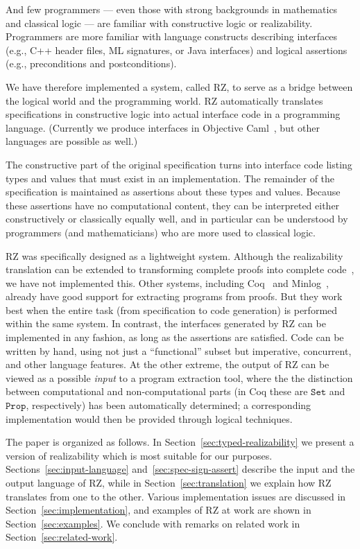 And few programmers --- even those with strong backgrounds in
mathematics and classical logic --- are familiar with constructive logic or
realizability.  Programmers are more familiar with language constructs
describing interfaces (e.g., C++ header files, ML signatures, or Java
interfaces) and logical assertions (e.g., preconditions
and postconditions).


We have therefore implemented a system, called RZ, to serve as a bridge between
the logical world and the programming world. RZ automatically translates
specifications in constructive logic into actual interface code in a
programming language. (Currently we produce interfaces in 
Objective Caml~\cite{ocaml}, but other languages are possible
as well.)

The constructive part of the original specification turns into interface code
listing types and values that must exist in an implementation. The remainder of
the specification is maintained as assertions about these types and values.
Because these assertions have no computational content, they can be interpreted
either constructively or classically equally well, and in particular can
be understood by programmers (and mathematicians) who are more used to
classical logic.


RZ was specifically designed as a lightweight system. Although the
realizability translation can be extended to transforming complete
proofs into complete code~\cite{komagata+:tr95}, we have not
implemented this. Other systems, including Coq~\cite{coqart} and
Minlog~\cite{benl98:_proof_theor_work}, already have good support for
extracting programs from proofs. But they work best when the entire
task (from specification to code generation) is performed within the
same system. In contrast, the interfaces generated by RZ can be
implemented in any fashion, as long as the assertions are satisfied.
Code can be written by hand, using not just a ``functional'' subset
but imperative, concurrent, and other language features. At the other
extreme, the output of RZ can be viewed as a possible \emph{input} to
a program extraction tool, where the the distinction between
computational and non-computational parts (in Coq these are
$\mathtt{Set}$ and $\mathtt{Prop}$, respectively) has been
automatically determined; a corresponding implementation would then be
provided through logical techniques.


The paper is organized as follows. In
Section~\ref{sec:typed-realizability} we present a version of
realizability which is most suitable for our purposes.
Sections~\ref{sec:input-language} and~\ref{sec:spec-sign-assert}
describe the input and the output language of RZ, while in
Section~\ref{sec:translation} we explain how RZ translates from one to
the other. Various implementation issues are discussed in
Section~\ref{sec:implementation}, and examples of RZ at work are shown
in Section~\ref{sec:examples}. We conclude with remarks on related
work in Section~\ref{sec:related-work}.


